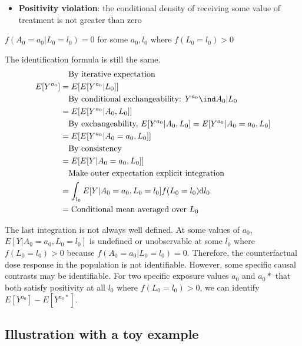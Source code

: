\documentclass[dvipdfmx,10pt]{article}
\begin{document}
\begin{itemize}
\item \textbf{Positivity violation}: the conditional density of receiving some value of treatment is not greater than zero
\end{itemize}
\begin{center}
\(f(A_{0} = a_{0} | L_{0} = l_{0}) = 0\) for some \(a_{0},l_{0}\) where \(f(L_{0} = l_{0}) > 0\)
\end{center}

The identification formula is still the same.
\begin{align*}
  &~~~\text{By iterative expectation}\\
  E[Y^{a_{0}}]
  &= E[E[Y^{a_{0}} | L_{0}]]\\
  &~~~\text{By conditional exchangeability: } Y^{a_{0}} \ind A_{0} | L_{0}\\
  &= E[E[Y^{a_{0}} | A_{0}, L_{0}]]\\
  &~~~\text{By exchangeability, }E[Y^{a_{0}} | A_{0}, L_{0}] = E[Y^{a_{0}} | A_{0} = a_{0}, L_{0}]\\
  &= E[E[Y^{a_{0}} | A_{0} = a_{0}, L_{0}]]\\
  &~~~\text{By consistency}\\
  &= E[E[Y | A_{0} = a_{0}, L_{0}]]\\
  &~~~\text{Make outer expectation explicit integration}\\
  &= \int_{l_{0}} E[Y | A_{0} = a_{0}, L_{0} = l_{0}] f(L_{0} = l_{0}) \text{d}l_{0}\\
  &= \text{Conditional mean averaged over $L_{0}$}\\
\end{align*}

The last integration is not always well defined. At some values of \(a_{0}\), \(E[Y | A_{0} = a_{0}, L_{0} = l_{0}]\) is undefined or unobservable at some \(l_{0}\) where \(f(L_{0} = l_{0}) > 0\) because \(f(A_{0} = a_{0} | L_{0} = l_{0}) = 0\). Therefore, the counterfactual dose response in the population is not identifiable. However, some specific causal contrasts may be identifiable. For two specific exposure values \(a_{0}\) and \(a_{0}*\) that both satisfy positivity at all \(l_{0}\) where \(f(L_{0} = l_{0}) > 0\), we can identify \(E[Y^{a_{0}}] - E[Y^{a_{0}*}]\).

\subsection{Illustration with a toy example}
\label{sec:orgd3db077}
\end{document}
